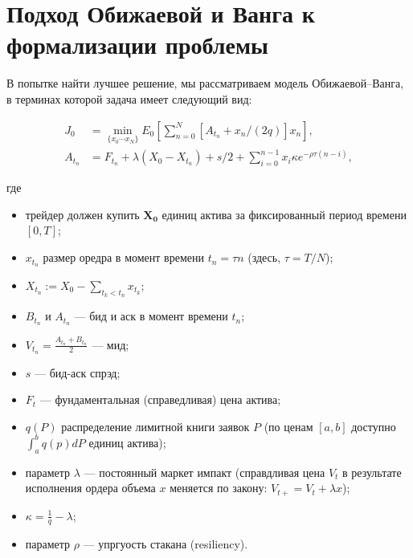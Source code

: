\section{Подход Обижаевой и Ванга к формализации проблемы}
В попытке найти лучшее решение, мы рассматриваем модель Обижаевой--Ванга,
в терминах которой задача имеет следующий вид: \par
\begin{align*} \label{oEproblem}
    J_0 &= \min _{\{x_0 \cdots x_N \}} E_0 \left[ \sum _{n=0}^N [A_{t_n} + x_n /(2q)] x_n\right],  \\
    A_{t_n} &= F_{t_n} + \lambda (X_0 - X_{t_n}) + s/2 + \sum _{i=0}^{n-1} x_i \kappa e^{- \rho \tau (n - i)},
 \end{align*}
 
где
\begin{itemize}
 \item трейдер должен купить $\mathbf{X_0}$ единиц актива за фиксированный период времени $[0,T]$;
 \item $x_{t_n}$ размер оредра в момент времени $t_n = \tau n$ (здесь, $\tau = T / N$); 
 \item $X_{t_n} := X_0 - \sum _{t_k < t_n} x_{t_k}$;
 \item $B_{t_n}$ и $A_{t_n}$ --- бид и аск в момент времени $t_n$; 
 \item $V_{t_n} = \frac{A_{t_n} + B_{t_n}}{2}$ --- мид; 
 \item $s$ --- бид-аск спрэд;
 \item $F_t$ --- фундаментальная (справедливая) цена актива;
 \item $q(P)$ распределение лимитной книги заявок $P$ (по ценам $[a, b]$ доступно $\int_a^b q(p) dP$ единиц актива);
 \item параметр $\lambda$ --- постоянный маркет импакт (справдливая цена $V_t$ в результате исполнения ордера объема $x$ меняется по закону: $V_{t+} = V_t + \lambda x$);
  \item $\kappa = \frac{1}{q} - \lambda $;
 \item параметр $\rho$ --- упргуость стакана (resiliency).
\end{itemize}


